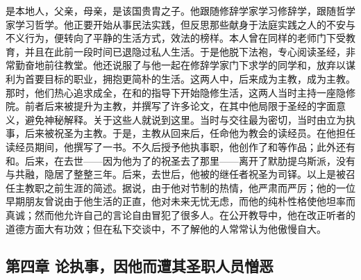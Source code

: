 是本地人，父亲，母亲，是该国贵胄之子。他跟随修辞学家学习修辞学，跟随哲学家学习哲学。他正要开始从事民法实践，但反思那些献身于法庭实践之人的不安与不义行为，便转向了平静的生活方式，效法的榜样。本人曾在同样的老师门下受教育，并且在此前一段时间已退隐过私人生活。于是他脱下法袍，专心阅读圣经，非常勤奋地前往教堂。他还说服了与他一起在修辞学家门下求学的同学和，放弃以谋利为首要目标的职业，拥抱更简朴的生活。这两人中，后来成为主教，成为主教。那时，他们热心追求成全，在和的指导下开始隐修生活，这两人当时主持一座隐修院。前者后来被提升为主教，并撰写了许多论文，在其中他局限于圣经的字面意义，避免神秘解释。关于这些人就说到这里。当时与交往最为密切，当时由立为执事，后来被祝圣为主教。于是，主教从回来后，任命他为教会的读经员。在他担任读经员期间，他撰写了一书。不久后授予他执事职，他创作了和等作品；此外还有和。后来，在去世——因为他为了的祝圣去了那里——离开了默肋提乌斯派，没有与共融，隐居了整整三年。后来，去世后，他被的继任者祝圣为司铎。以上是被召任主教职之前生涯的简述。据说，由于他对节制的热情，他严肃而严厉；他的一位早期朋友曾说由于他生活的正直，他对未来无忧无虑，而他的纯朴性格使他坦率而真诚；然而他允许自己的言论自由冒犯了很多人。在公开教导中，他在改正听者的道德方面大有功效；但在私下交谈中，不了解他的人常常认为他傲慢自大。\par


\subsection{第四章 论执事，因他而遭其圣职人员憎恶}

